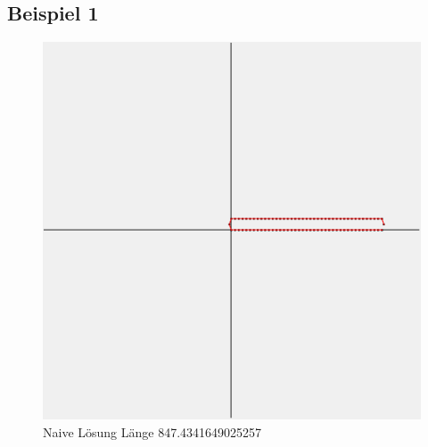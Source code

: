 \subsection{Beispiel 1}\label{subsec:beispiel-1}
\begin{figure}[h]
    \centering
    \begin{minipage}[b]{0.6\textwidth}
        \includegraphics[width=\textwidth]{naivwenigerkrumm1}
        \caption{Naive Lösung Länge 847.4341649025257}
    \end{minipage}\label{fig:wenigerkrumm1}
\end{figure}
\FloatBarrier

